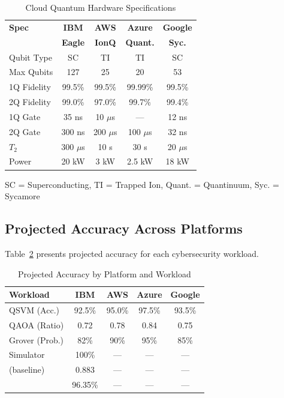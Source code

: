 \documentclass[conference]{IEEEtran}
\begin{document}
\begin{table}[htbp]
\caption{Cloud Quantum Hardware Specifications}
\label{tab:hardware}
\centering
\small
\begin{tabular}{lcccc}
\toprule
\textbf{Spec} & \textbf{IBM} & \textbf{AWS} & \textbf{Azure} & \textbf{Google} \\
 & \textbf{Eagle} & \textbf{IonQ} & \textbf{Quant.} & \textbf{Syc.} \\
\midrule
Qubit Type & SC & TI & TI & SC \\
Max Qubits & 127 & 25 & 20 & 53 \\
1Q Fidelity & 99.5\% & 99.5\% & 99.99\% & 99.5\% \\
2Q Fidelity & 99.0\% & 97.0\% & 99.7\% & 99.4\% \\
1Q Gate & 35 ns & 10 $\mu$s & --- & 12 ns \\
2Q Gate & 300 ns & 200 $\mu$s & 100 $\mu$s & 32 ns \\
$T_2$ & 300 $\mu$s & 10 s & 30 s & 20 $\mu$s \\
Power & 20 kW & 3 kW & 2.5 kW & 18 kW \\
\bottomrule
\end{tabular}
\vspace{1mm}
\footnotesize{SC = Superconducting, TI = Trapped Ion, Quant. = Quantinuum, Syc. = Sycamore}
\end{table}

\subsection{Projected Accuracy Across Platforms}

Table~\ref{tab:accuracy} presents projected accuracy for each cybersecurity workload.

\begin{table}[htbp]
\caption{Projected Accuracy by Platform and Workload}
\label{tab:accuracy}
\centering
\begin{tabular}{lcccc}
\toprule
\textbf{Workload} & \textbf{IBM} & \textbf{AWS} & \textbf{Azure} & \textbf{Google} \\
\midrule
QSVM (Acc.) & 92.5\% & 95.0\% & 97.5\% & 93.5\% \\
QAOA (Ratio) & 0.72 & 0.78 & 0.84 & 0.75 \\
Grover (Prob.) & 82\% & 90\% & 95\% & 85\% \\
\midrule
Simulator & 100\% & --- & --- & --- \\
(baseline) & 0.883 & --- & --- & --- \\
 & 96.35\% & --- & --- & --- \\
\bottomrule
\end{tabular}
\end{table}
\end{document}
